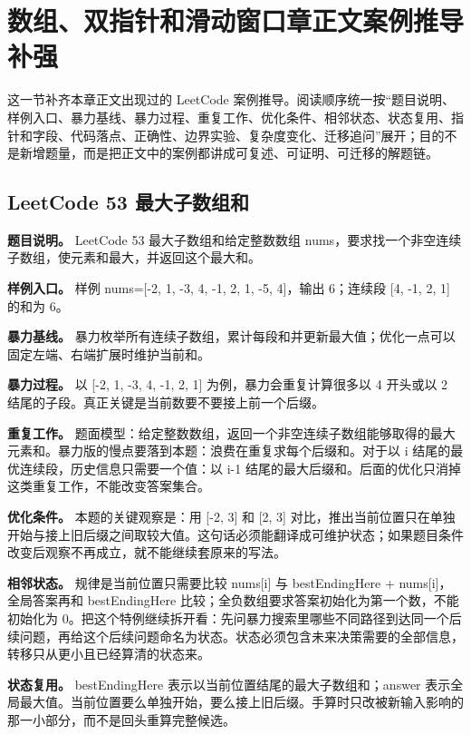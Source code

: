 \section{数组、双指针和滑动窗口章正文案例推导补强}

这一节补齐本章正文出现过的 LeetCode 案例推导。阅读顺序统一按“题目说明、样例入口、暴力基线、暴力过程、重复工作、优化条件、相邻状态、状态复用、指针和字段、代码落点、正确性、边界实验、复杂度变化、迁移追问”展开；目的不是新增题量，而是把正文中的案例都讲成可复述、可证明、可迁移的解题链。

\subsection{LeetCode 53 最大子数组和}

\textbf{题目说明。} LeetCode 53 最大子数组和给定整数数组 nums，要求找一个非空连续子数组，使元素和最大，并返回这个最大和。

\textbf{样例入口。} 样例 nums=[-2, 1, -3, 4, -1, 2, 1, -5, 4]，输出 6；连续段 [4, -1, 2, 1] 的和为 6。

\textbf{暴力基线。} 暴力枚举所有连续子数组，累计每段和并更新最大值；优化一点可以固定左端、右端扩展时维护当前和。

\textbf{暴力过程。} 以 [-2, 1, -3, 4, -1, 2, 1] 为例，暴力会重复计算很多以 4 开头或以 2 结尾的子段。真正关键是当前数要不要接上前一个后缀。

\textbf{重复工作。} 题面模型：给定整数数组，返回一个非空连续子数组能够取得的最大元素和。暴力版的慢点要落到本题：浪费在重复求每个后缀和。对于以 i 结尾的最优连续段，历史信息只需要一个值：以 i-1 结尾的最大后缀和。后面的优化只消掉这类重复工作，不能改变答案集合。

\textbf{优化条件。} 本题的关键观察是：用 [-2, 3] 和 [2, 3] 对比，推出当前位置只在单独开始与接上旧后缀之间取较大值。这句话必须能翻译成可维护状态；如果题目条件改变后观察不再成立，就不能继续套原来的写法。

\textbf{相邻状态。} 规律是当前位置只需要比较 nums[i] 与 bestEndingHere + nums[i]，全局答案再和 bestEndingHere 比较；全负数组要求答案初始化为第一个数，不能初始化为 0。把这个特例继续拆开看：先问暴力搜索里哪些不同路径到达同一个后续问题，再给这个后续问题命名为状态。状态必须包含未来决策需要的全部信息，转移只从更小且已经算清的状态来。

\textbf{状态复用。} bestEndingHere 表示以当前位置结尾的最大子数组和；answer 表示全局最大值。当前位置要么单独开始，要么接上旧后缀。手算时只改被新输入影响的那一小部分，而不是回头重算完整候选。

